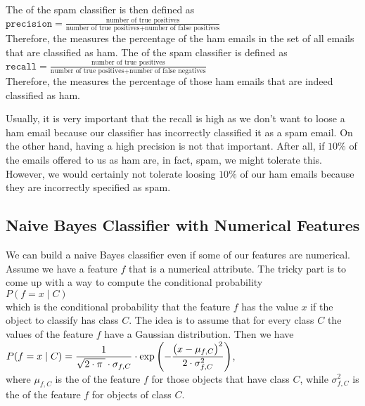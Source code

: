 \begin{enumerate}
      The  of the spam classifier is then defined as
      \\[0.2cm]
      \hspace*{1.3cm}
      $ \texttt{precision} = \frac{\mbox{number of true positives}}{\mbox{number of true positives} + \mbox{number of false positives}} $
      \\[0.2cm]
      Therefore, the  measures the percentage of the ham emails in the set of all emails that are classified as ham.
      The  of the spam classifier is defined as
      \\[0.2cm]
      \hspace*{1.3cm}
      $ \texttt{recall} = \frac{\mbox{number of true positives}}{\mbox{number of true positives} + \mbox{number of false negatives}} $
      \\[0.2cm]
      Therefore, the  measures the percentage of those ham emails that are indeed classified as ham.  

      Usually, it is very important that the recall is high as we don't want to loose a ham email because our classifier has incorrectly classified it as a spam email.  
      On the other hand, having a high precision is not that important.  After all, if $10\%$ of the emails
      offered to us as ham are, in fact, spam, we might tolerate this.  However, we
      would certainly not tolerate loosing $10\%$ of our ham emails because they are
      incorrectly specified as spam.       
\end{enumerate}

\subsection{Naive Bayes Classifier with Numerical Features}
We can build a naive Bayes classifier even if some of our features are numerical.  Assume we have a feature $f$
that is a numerical attribute.  The tricky part is to come up with a way to compute the conditional probability
\\[0.2cm]
\hspace*{1.3cm}
$P(f = x \mid C)$
\\[0.2cm]
which is the conditional probability that the feature $f$ has the value $x$ if the object to classify has class
$C$.  The idea is to assume that for every class $C$ the values of the feature $f$ have a Gaussian
distribution.  Then we have
\\[0.2cm]
\hspace*{1.3cm}
$\displaystyle P(f = x \mid C) = \frac{1}{\sqrt{2\cdot\pi\;} \cdot \sigma_{f,C}} \cdot \exp\left(-\frac{\bigl(x-\mu_{f,C}\bigr)^2}{2 \cdot \sigma_{f,C}^2}\right)$,
\\[0.2cm]
where $\mu_{f,C}$ is the  of the feature $f$ for those objects that have class $C$, while
$\sigma_{f,C}^2$ is the  of the feature $f$ for objects of class $C$.


